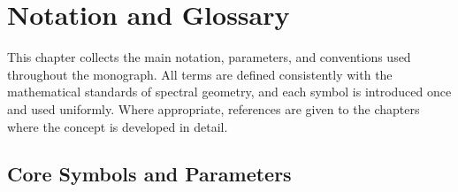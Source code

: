 
\chapter*{Notation and Glossary}
\label{chap:notation-glossary}

This chapter collects the main notation, parameters, and conventions used throughout the monograph.  
All terms are defined consistently with the mathematical standards of spectral geometry, and each symbol is introduced once and used uniformly.  
Where appropriate, references are given to the chapters where the concept is developed in detail.

\section*{Core Symbols and Parameters}

